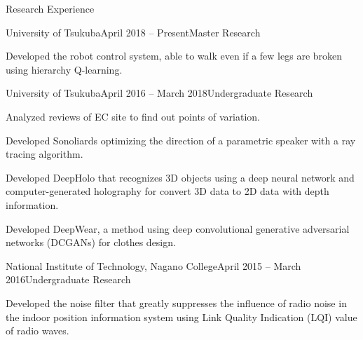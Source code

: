\documentclass{resume} %
\begin{document}
\begin{rSection}{Research Experience}

    \begin{rSubsection}{University of Tsukuba}{April 2018 -- Present}{Master Research}{}
    \item Developed the robot control system, able to walk even if a few legs are broken using hierarchy Q-learning.
    \end{rSubsection}

    \begin{rSubsection}{University of Tsukuba}{April 2016 -- March 2018}{Undergraduate Research}{}
    \item Analyzed reviews of EC site to find out points of variation.
    \item Developed Sonoliards optimizing the direction of a parametric speaker with a ray tracing algorithm.
    \item Developed DeepHolo that recognizes 3D objects using a deep neural network and computer-generated holography for convert 3D data to 2D data with depth information.
    \item Developed DeepWear, a method using deep convolutional generative adversarial networks (DCGANs) for clothes design.
    \end{rSubsection}

    \begin{rSubsection}{National Institute of Technology, Nagano College}{April 2015 -- March 2016}{Undergraduate Research}{}
    \item Developed the noise filter that greatly suppresses the influence of radio noise in the indoor position information system using Link Quality Indication (LQI) value of radio waves.
    \end{rSubsection}

\end{rSection}

\end{document}
